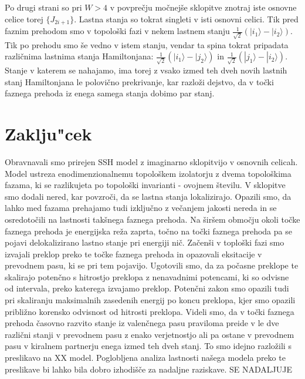 Po drugi strani so pri $W>4$ v povprečju močnejše sklopitve znotraj iste osnovne celice torej $\{ J_{2i+1} \}$. Lastna stanja so tokrat singleti v isti osnovni celici.
Tik pred faznim prehodom smo v topološki fazi v nekem lastnem stanju $\frac{1}{\sqrt{2}} (| i_1 \rangle - | i_2 \rangle)$. Tik po prehodu smo še vedno v istem stanju, vendar ta spina tokrat pripadata različnima lastnima stanja Hamiltonjana: $\frac{1}{\sqrt{2}} ( |i_1 \rangle - |j_2 \rangle)$ in $\frac{1}{\sqrt{2}} ( |j_1 \rangle - |i_2 \rangle)$. Stanje v katerem se nahajamo, ima torej z vsako izmed teh dveh novih lastnih stanj Hamiltonjana le polovično prekrivanje, kar razloži dejstvo, da v točki faznega prehoda iz enega samega stanja dobimo par stanj.



%
\chapter{Zaklju"cek}
Obravnavali smo prirejen SSH model z imaginarno sklopitvijo v osnovnih celicah. Model ustreza enodimenzionalnemu topološkem izolatorju z dvema topološkima fazama, ki se razlikujeta po topološki invarianti -  ovojnem številu. V sklopitve smo dodali nered, kar povzroči, da se lastna stanja lokalizirajo. Opazili smo, da lahko med fazama prehajamo tudi izključno z večanjem jakosti nereda in se osredotočili na lastnosti takšnega faznega prehoda. Na širšem območju okoli točke faznega prehoda je energijska reža zaprta, točno na točki faznega prehoda pa se pojavi delokalizirano lastno stanje pri energiji nič.  
Začenši v toploški fazi smo izvajali preklop preko te točke faznega prehoda in opazovali eksitacije v prevodnem pasu, ki se pri tem pojavijo. Ugotovili smo, da za počasne preklope te skalirajo potenčno s hitrostjo preklopa z nenavadnimi potencami, ki so odvisne od intervala, preko katerega izvajamo preklop. Potenčni zakon smo opazili tudi pri skaliranju maksimalnih zasedenih energij po koncu preklopa, kjer smo opazili približno korensko odvisnost od hitrosti preklopa.
Videli smo, da v točki faznega prehoda časovno razvito stanje iz valenčnega pasu praviloma preide v le dve različni stanji v prevodnem pasu z enako verjetnostjo ali pa ostane v prevodnem pasu v kiralnem partnerju enega izmed teh dveh stanj. To smo idejno razložili s preslikavo na XX model. Poglobljena analiza lastnosti našega modela preko te preslikave bi lahko bila dobro izhodišče za nadaljne raziskave. SE NADALJUJE


